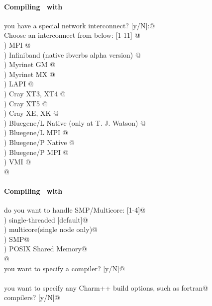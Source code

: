 
\begin{frame}[fragile] 
\secframetitle{\ssInstallCharm}
\framesubtitle{Compiling \charm\ with }
\color{black}
\footnotesize

\verb@Do you have a special network interconnect? [y/N]:@
\pause
\verb@y@ \\
\verb@	Choose an interconnect from below: [1-11] @ \\
) MPI @ \\
) Infiniband (native ibverbs alpha version) @ \\
) Myrinet GM @ \\
) Myrinet MX @ \\
) LAPI @ \\
) Cray XT3, XT4 @ \\
) Cray XT5 @ \\
) Cray XE, XK @ \\
) Bluegene/L Native (only at T. J. Watson) @ \\
) Bluegene/L MPI @ \\
) Bluegene/P Native @ \\
) Bluegene/P MPI @ \\
) VMI @ \\
\verb@  @

\end{frame}


\begin{frame}[fragile] 
\secframetitle{\ssInstallCharm}
\framesubtitle{Compiling \charm\ with }
\color{black}
\footnotesize

\verb@How do you want to handle SMP/Multicore: [1-4]@ \\
) single-threaded [default]@ \\
) multicore(single node only)@ \\
) SMP@ \\
) POSIX Shared Memory@ \\
\verb@  @
\pause
\ \\
\verb@Do you want to specify a compiler? [y/N]@\pause\verb@n@ \\
\ \\
\verb@Do you want to specify any Charm++ build options, such as fortran@ \\
\verb@   compilers? [y/N]@ \\

\end{frame}

